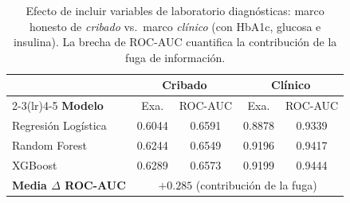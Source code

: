 \begin{table}[!t]
\renewcommand{\arraystretch}{1.2}
\caption{Efecto de incluir variables de laboratorio diagnósticas: marco honesto
de \emph{cribado} vs.\ marco \emph{clínico} (con HbA1c, glucosa e insulina). La
brecha de ROC-AUC cuantifica la contribución de la fuga de información.}
\label{tab:framing}
\centering
\begin{tabular}{l c c c c}
\toprule
& \multicolumn{2}{c}{\textbf{Cribado}} & \multicolumn{2}{c}{\textbf{Clínico}} \\
\cmidrule(lr){2-3}\cmidrule(lr){4-5}
\textbf{Modelo} & Exa. & ROC-AUC & Exa. & ROC-AUC \\
\midrule
Regresión Logística & 0.6044 & 0.6591 & 0.8878 & 0.9339 \\
Random Forest       & 0.6244 & 0.6549 & 0.9196 & 0.9417 \\
XGBoost             & 0.6289 & 0.6573 & 0.9199 & 0.9444 \\
\midrule
\multicolumn{1}{l}{\textbf{Media $\Delta$ ROC-AUC}} & \multicolumn{4}{c}{$+0.285$ (contribución de la fuga)} \\
\bottomrule
\end{tabular}
\end{table}
